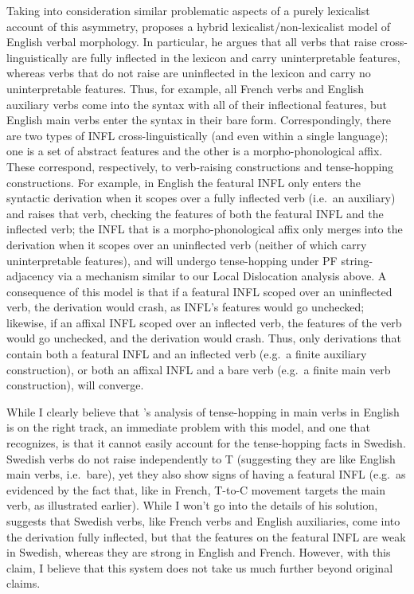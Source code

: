 Taking into consideration similar problematic aspects of a purely lexicalist account of this asymmetry, \citet{lasnik1995} proposes a hybrid lexicalist/non-lexicalist model of English verbal morphology. In particular, he argues that all verbs that raise cross-linguistically are fully inflected in the lexicon and carry uninterpretable features, whereas verbs that do not raise are uninflected in the lexicon and carry no uninterpretable features. Thus, for example, all French verbs and English auxiliary verbs come into the syntax with all of their inflectional features, but English main verbs enter the syntax in their bare form. Correspondingly, there are two types of INFL cross-linguistically (and even within a single language); one is a set of abstract features and the other is a morpho-phonological affix. These correspond, respectively, to verb-raising constructions and tense-hopping constructions. For example, in English the featural INFL only enters the syntactic derivation when it scopes over a fully inflected verb (i.e.\ an auxiliary) and raises that verb, checking the features of both the featural INFL and the inflected verb; the INFL that is a morpho-phonological affix only merges into the derivation when it scopes over an uninflected verb (neither of which carry uninterpretable features), and will undergo tense-hopping under PF string-adjacency via a mechanism similar to our Local Dislocation analysis above. A consequence of this model is that if a featural INFL scoped over an uninflected verb, the derivation would crash, as INFL's features would go unchecked; likewise, if an affixal INFL scoped over an inflected verb, the features of the verb would go unchecked, and the derivation would crash. Thus, only derivations that contain both a featural INFL and an inflected verb (e.g.\ a finite auxiliary construction), or both an affixal INFL and a bare verb (e.g.\ a finite main verb construction), will converge.

While I clearly believe that \citeauthor{lasnik1995}'s analysis of tense-hopping in main verbs in English is on the right track, an immediate problem with this model, and one that \citeauthor{lasnik1995} recognizes, is that it cannot easily account for the tense-hopping facts in Swedish. Swedish verbs do not raise independently to T (suggesting they are like English main verbs, i.e.\ bare), yet they also show signs of having a featural INFL (e.g.\ as evidenced by the fact that, like in French, T-to-C movement targets the main verb, as illustrated earlier). While I won't go into the details of his solution, \citeauthor{lasnik1995} suggests that Swedish verbs, like French verbs and English auxiliaries, come into the derivation fully inflected, but that the features on the featural INFL are weak in Swedish, whereas they are strong in English and French. However, with this claim, I believe that this system does not take us much further beyond  original claims.

